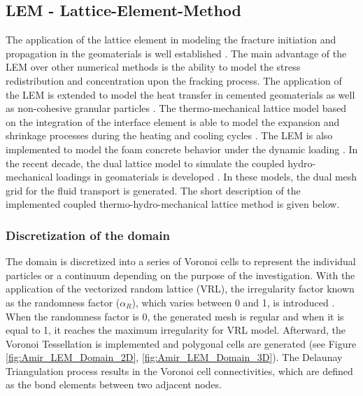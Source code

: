 \subsection{LEM - Lattice-Element-Method}

The application of the lattice element in modeling the fracture initiation and propagation in the geomaterials is well established \cite{Liuetal2007, Pradoetal2003, Vanmieretal2002}. The main advantage of the LEM over other numerical methods is the ability to model the stress redistribution and concentration upon the fracking process. The application of the LEM is extended to model the heat transfer in cemented geomaterials \cite{Sattarietal2017} as well as non-cohesive granular particles \cite{Rizvietal2018b}. The thermo-mechanical lattice model based on the integration of the interface element is able to model the expansion and shrinkage processes during the heating and cooling cycles \cite{Sattarietal2019b}. The LEM is also implemented to model the foam concrete behavior under the dynamic loading \cite{Rizvietal2018a}. In the recent decade, the dual lattice model to simulate the coupled hydro-mechanical loadings in geomaterials is developed \cite{Grassl2009}. In these models, the dual mesh grid for the fluid transport is generated. The short description of the implemented coupled thermo-hydro-mechanical lattice method is given below.

\subsubsection*{Discretization of the domain}

The domain is discretized into a series of Voronoi cells to represent the individual particles or a continuum depending on the purpose of the investigation. With the application of the vectorized random lattice (VRL), the irregularity factor known as the randomness factor ($\alpha_{R}$), which varies between 0 and 1, is introduced \cite{Moukarzeletal1992}. When the randomness factor is 0, the generated mesh is regular and when it is equal to 1, it reaches the maximum irregularity for VRL model.  Afterward, the Voronoi Tessellation is implemented and polygonal cells are generated (see Figure \ref{fig:Amir_LEM_Domain_2D}, \ref{fig:Amir_LEM_Domain_3D}). The Delaunay Triangulation process results in the Voronoi cell connectivities, which are defined as the bond elements between two adjacent nodes. 

